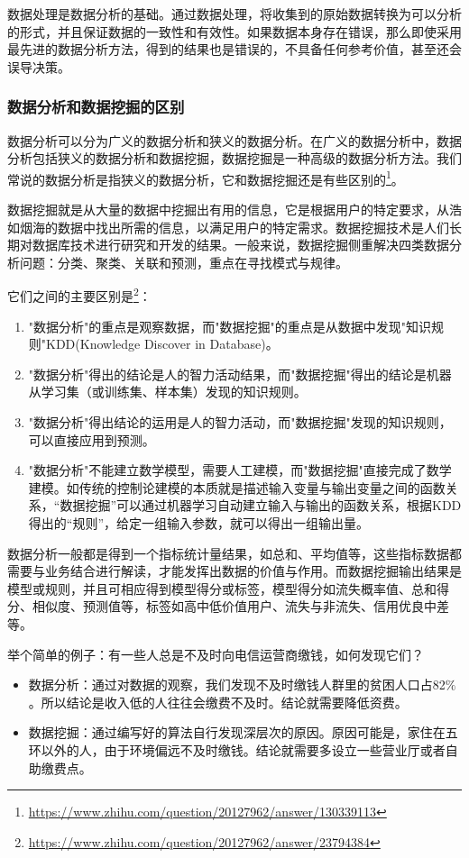 数据处理是数据分析的基础。通过数据处理，将收集到的原始数据转换为可以分析的形式，并且保证数据的一致性和有效性。如果数据本身存在错误，那么即使采用最先进的数据分析方法，得到的结果也是错误的，不具备任何参考价值，甚至还会误导决策。

\subsubsection{数据分析和数据挖掘的区别}

数据分析可以分为广义的数据分析和狭义的数据分析。在广义的数据分析中，数据分析包括狭义的数据分析和数据挖掘，数据挖掘是一种高级的数据分析方法。我们常说的数据分析是指狭义的数据分析，它和数据挖掘还是有些区别的\footnote{\url{https://www.zhihu.com/question/20127962/answer/130339113}}。

数据挖掘就是从大量的数据中挖掘出有用的信息，它是根据用户的特定要求，从浩如烟海的数据中找出所需的信息，以满足用户的特定需求。数据挖掘技术是人们长期对数据库技术进行研究和开发的结果。一般来说，数据挖掘侧重解决四类数据分析问题：分类、聚类、关联和预测，重点在寻找模式与规律。

它们之间的主要区别是\footnote{\url{https://www.zhihu.com/question/20127962/answer/23794384}}：
\begin{enumerate}
	\item "数据分析"的重点是观察数据，而"数据挖掘"的重点是从数据中发现"知识规则"KDD(Knowledge Discover in Database)。
    \item "数据分析"得出的结论是人的智力活动结果，而"数据挖掘"得出的结论是机器从学习集（或训练集、样本集）发现的知识规则。
    \item "数据分析"得出结论的运用是人的智力活动，而"数据挖掘"发现的知识规则，可以直接应用到预测。
    \item "数据分析"不能建立数学模型，需要人工建模，而"数据挖掘"直接完成了数学建模。如传统的控制论建模的本质就是描述输入变量与输出变量之间的函数关系，“数据挖掘”可以通过机器学习自动建立输入与输出的函数关系，根据KDD得出的“规则”，给定一组输入参数，就可以得出一组输出量。
\end{enumerate}

数据分析一般都是得到一个指标统计量结果，如总和、平均值等，这些指标数据都需要与业务结合进行解读，才能发挥出数据的价值与作用。而数据挖掘输出结果是模型或规则，并且可相应得到模型得分或标签，模型得分如流失概率值、总和得分、相似度、预测值等，标签如高中低价值用户、流失与非流失、信用优良中差等。

举个简单的例子：有一些人总是不及时向电信运营商缴钱，如何发现它们？

\begin{itemize}
    \item 数据分析：通过对数据的观察，我们发现不及时缴钱人群里的贫困人口占82$\%$。所以结论是收入低的人往往会缴费不及时。结论就需要降低资费。
    \item 数据挖掘：通过编写好的算法自行发现深层次的原因。原因可能是，家住在五环以外的人，由于环境偏远不及时缴钱。结论就需要多设立一些营业厅或者自助缴费点。
\end{itemize}

